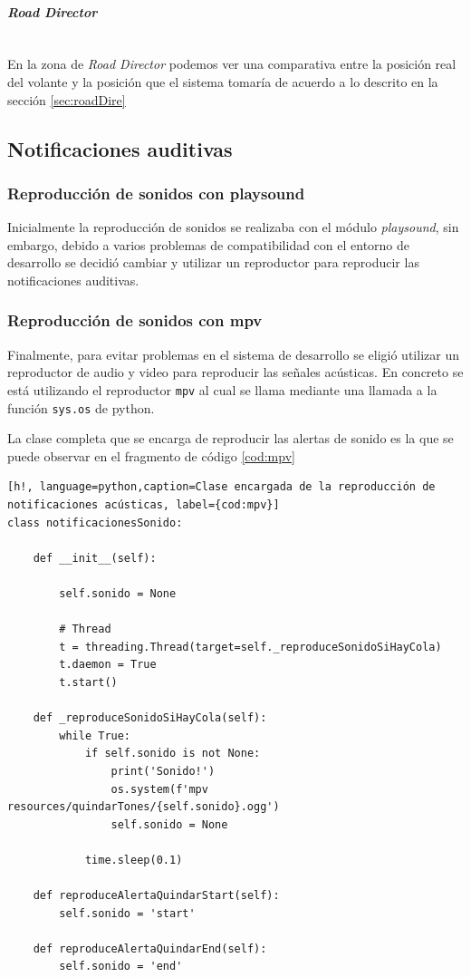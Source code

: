 \paragraph{\textit{Road Director}}\mbox{}\\
En la zona de \textit{Road Director} podemos ver una comparativa entre la posición real del volante y la posición que el sistema tomaría de acuerdo a lo descrito en la sección \ref{sec:roadDire}




\clearpage
\subsection{Notificaciones auditivas} 
\subsubsection{Reproducción de sonidos con playsound} \label{playsound}
Inicialmente la reproducción de sonidos se realizaba con el módulo \textit{playsound}, sin embargo, debido a varios problemas de compatibilidad con el entorno de desarrollo se decidió cambiar y utilizar un reproductor para reproducir las notificaciones auditivas.

\subsubsection{Reproducción de sonidos con mpv}
Finalmente, para evitar problemas en el sistema de desarrollo se eligió utilizar un reproductor de audio y video para reproducir las señales acústicas.
En concreto se está utilizando el reproductor \texttt{mpv} al cual se llama mediante una llamada a la función \texttt{sys.os} de python.

La clase completa que se encarga de reproducir las alertas de sonido es la que se puede observar en el fragmento de código \ref{cod:mpv}
\begin{lstlisting}[h!, language=python,caption=Clase encargada de la reproducción de notificaciones acústicas, label={cod:mpv}]
class notificacionesSonido:

    def __init__(self):
        
        self.sonido = None

        # Thread
        t = threading.Thread(target=self._reproduceSonidoSiHayCola)
        t.daemon = True
        t.start()
        
    def _reproduceSonidoSiHayCola(self):
        while True:
            if self.sonido is not None:
                print('Sonido!')
                os.system(f'mpv resources/quindarTones/{self.sonido}.ogg')
                self.sonido = None

            time.sleep(0.1)

    def reproduceAlertaQuindarStart(self):
        self.sonido = 'start'

    def reproduceAlertaQuindarEnd(self):
        self.sonido = 'end'
\end{lstlisting}


